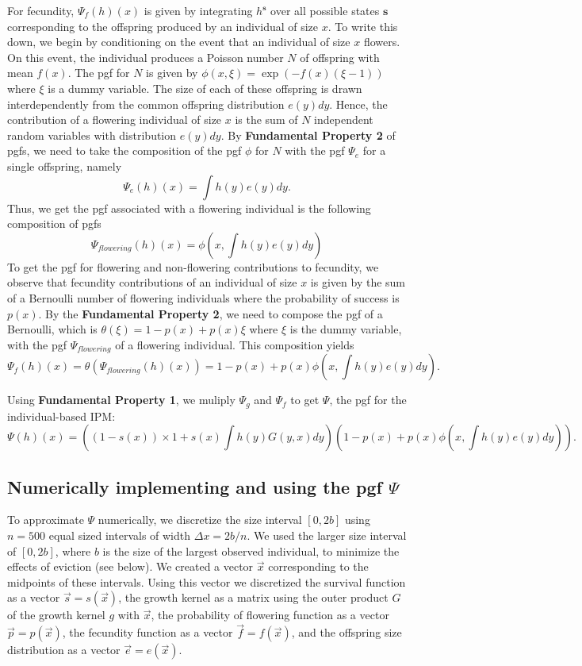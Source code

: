 \documentclass[12pt]{amsart}\usepackage[]{graphicx}\usepackage[]{color}
\def\s{\mathbf s}
\begin{document}
For fecundity, $\Psi_f(h)(x)$ is given by integrating $h^\s$ over all possible states $\s$ corresponding to the offspring produced by an individual of size $x$.  To write this down, we begin by conditioning on the event that an individual of size $x$ flowers. On this event, the individual produces a Poisson number $N$ of offspring with mean $f(x)$. The pgf for $N$ is given by $\phi(x, \xi)=\exp(-f(x)(\xi-1))$ where $\xi$ is a dummy variable. The size of each of these offspring is drawn interdependently from the common offspring distribution $e(y)dy$. Hence, the contribution of a flowering individual of size $x$ is the sum of $N$ independent random variables with distribution $e(y)dy$. By \textbf{Fundamental Property 2} of pgfs, we need to take the composition of the pgf $\phi$ for $N$ with the pgf $\Psi_e$ for a single offspring, namely
\[
\Psi_e(h)(x)=\int h(y)e(y)dy.
\]
Thus, we get the pgf associated with a flowering individual is the following composition of pgfs
\[
\Psi_{flowering}(h)(x)=\phi(x, \int h(y)e(y)dy)
\]
To get the pgf for flowering and non-flowering contributions to fecundity, we observe that fecundity contributions of an individual of size $x$ is given by the sum of a Bernoulli number of flowering individuals where the probability of success is $p(x)$. By the \textbf{Fundamental Property 2}, we need to compose the pgf of a Bernoulli, which is $\theta(\xi)=1-p(x)+p(x)\xi$ where $\xi$ is the dummy variable, with the pgf $\Psi_{flowering}$ of a flowering individual. This composition yields
\[
\Psi_f (h)(x)=\theta(\Psi_{flowering}(h)(x))=1-p(x)+p(x)\phi(x, \int h(y)e(y)dy).
\]


Using \textbf{Fundamental Property 1}, we muliply $\Psi_g$ and $\Psi_f$ to get $\Psi$, the pgf for the individual-based IPM:
\[
\Psi(h)(x)=\left((1-s(x))\times 1 + s(x)\int h(y)G(y, x)dy\right)\left(1-p(x)+p(x)\phi(x, \int h(y)e(y)dy)\right).
\]


\subsection*{Numerically implementing and using the pgf $\Psi$}

To approximate $\Psi$ numerically, we discretize the size interval $[0, 2b]$ using $n=500$ equal sized intervals of width $\Delta x=2b/n$. We used the larger size interval of $[0, 2b]$, where $b$ is the size of the largest observed individual, to minimize the effects of eviction (see below). We created a vector $\vec x$ corresponding to the midpoints of these intervals. Using this vector we discretized the survival function as a vector $\vec s=s(\vec x)$, the growth kernel as a matrix using the outer product $G$ of the growth kernel $g$ with $\vec x$, the probability of flowering function as a vector $\vec p=p(\vec x)$, the fecundity function as a vector $\vec f=f(\vec x)$, and the offspring size distribution as a vector $\vec e=e(\vec x)$.
\end{document}
